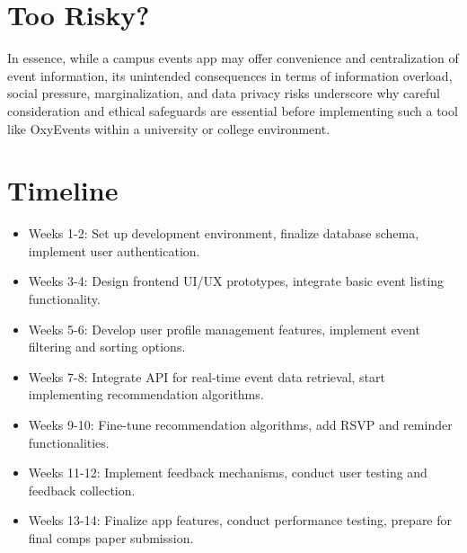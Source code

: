 \documentclass[10pt,twocolumn]{article}
\begin{document}
\section{Too Risky?}
In essence, while a campus events app may offer convenience and centralization of event information, its unintended consequences in terms of information overload, social pressure, marginalization, and data privacy risks underscore why careful consideration and ethical safeguards are essential before implementing such a tool like OxyEvents within a university or college environment.


\section{Timeline}
\begin{itemize}
    \item Weeks 1-2: Set up development environment, finalize database schema, implement user authentication.
    
    \item Weeks 3-4: Design frontend UI/UX prototypes, integrate basic event listing functionality.
    
    \item Weeks 5-6: Develop user profile management features, implement event filtering and sorting options. 
    
    \item Weeks 7-8: Integrate API for real-time event data retrieval, start implementing recommendation algorithms.
    
    \item Weeks 9-10: Fine-tune recommendation algorithms, add RSVP and reminder functionalities.
    
    \item Weeks 11-12: Implement feedback mechanisms, conduct user testing and feedback collection.
    
    \item Weeks 13-14: Finalize app features, conduct performance testing, prepare for final comps paper submission.
    
\end{itemize}

\printbibliography
\end{document}
